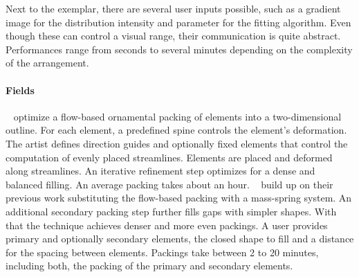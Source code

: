  Next to the exemplar, there are several user inputs possible, such as a gradient image for the distribution intensity and parameter for the fitting algorithm. Even though these can control a visual range, their communication is quite abstract. Performances range from seconds to several minutes depending on the complexity of the arrangement.


\paragraph*{Fields}
\label{para:analysis_element_arrangements_fields}

\citeauthor*{saputra_2017_ffo}~\cite{saputra_2017_ffo} optimize a flow-based ornamental packing of elements into a two-dimensional outline. For each element, a predefined spine controls the element's deformation. The artist defines direction guides and optionally fixed elements that control the computation of evenly placed streamlines. Elements are placed and deformed along streamlines. An iterative refinement step optimizes for a dense and balanced filling. An average packing takes about an hour. \citeauthor*{saputra_2018_rde}~\cite{saputra_2018_rde} build up on their previous work substituting the flow-based packing with a mass-spring system. An additional secondary packing step further fills gaps with simpler shapes. With that the technique achieves denser and more even packings. A user provides primary and optionally secondary elements, the closed shape to fill and a distance for the spacing between elements. Packings take between 2 to 20 minutes, including both, the packing of the primary and secondary elements.

